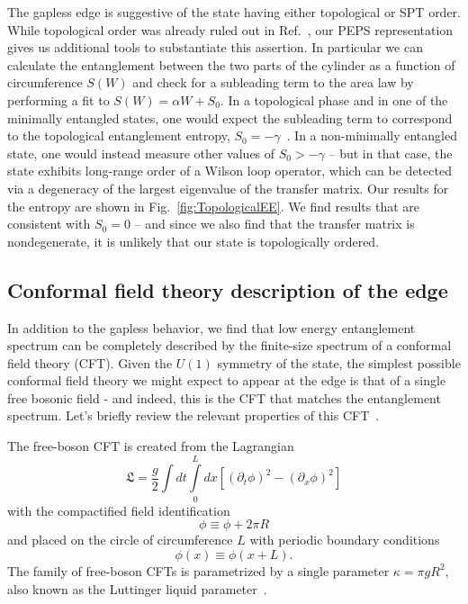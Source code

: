 The gapless edge is suggestive of the state having either topological or SPT order.
While topological order was already ruled out in Ref.~\cite{kimchi2013}, our PEPS
representation gives us additional tools to substantiate this assertion. In particular
we can calculate the entanglement between the two parts of the cylinder as a function
of circumference $S(W)$ and check for a subleading term to the area law by performing
a fit to $S(W) = \alpha W + S_0$. In a topological phase and in one of the minimally entangled
states, one would expect the subleading term to correspond to the topological entanglement
entropy, $S_0 = -\gamma$~\cite{kitaev2006, levin2006, jiang2012}.
In a non-minimally entangled state, one would instead measure other values of $S_0 > -\gamma$
-- but in that case, the state exhibits long-range order of a Wilson loop operator, which can be detected via a degeneracy of
 the largest eigenvalue of the transfer matrix.
Our results for the entropy are shown in Fig.~\ref{fig:TopologicalEE}. We find results that are consistent
with $S_0 = 0$ -- and since we also find that the transfer matrix is nondegenerate,
it is unlikely that our state is topologically ordered.

\subsection{Conformal field theory description of the edge}
\label{sec:CFT}

In addition to the gapless behavior, we find that low energy entanglement spectrum
can be completely described by the finite-size spectrum of a conformal field theory (CFT). 
Given the $U(1)$ symmetry of the state, the simplest possible
conformal field theory we might expect to appear at the edge is that
of a single free bosonic field - and indeed, this is the CFT that matches the 
entanglement spectrum.
Let's briefly review the relevant properties of this CFT~\cite{difrancesco}.

The free-boson CFT is created from the Lagrangian
\begin{equation}
\mathfrak{L} = \frac{g}{2}\int dt \int\limits_0^L dx \left[ (\partial_t \phi)^2 - (\partial_x \phi)^2 \right]
\end{equation}
with the compactified field identification
\begin{equation*}
\phi \equiv \phi + 2\pi R
\end{equation*}
and placed on the circle of circumference $L$ with periodic boundary conditions
\begin{equation*}
\phi(x) \equiv \phi(x+L).
\end{equation*}
The family of free-boson CFTs is parametrized by a single parameter
$\kappa = \pi g R^2$, also known as the Luttinger liquid parameter~\cite{giamarchi}.

